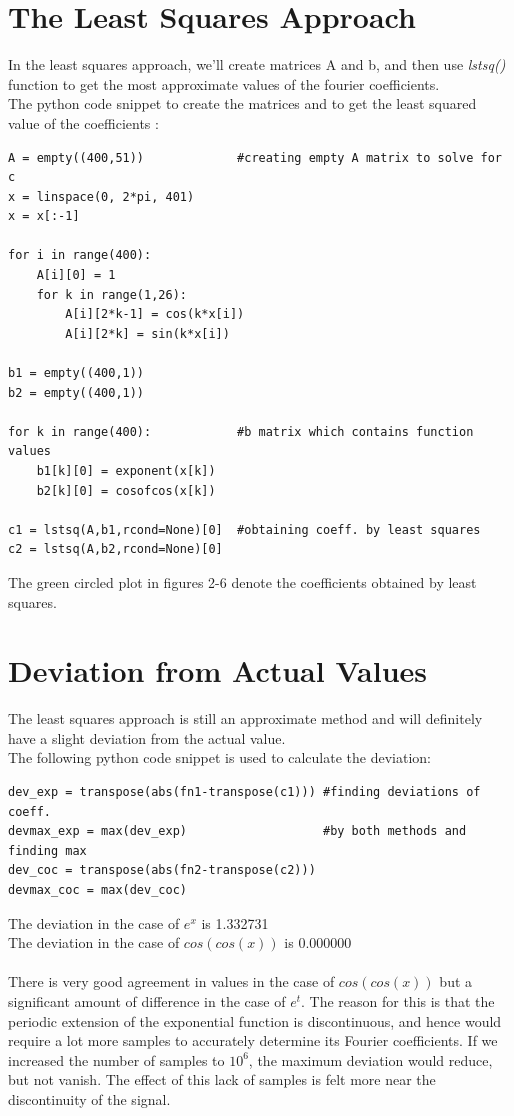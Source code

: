 \documentclass[11pt, a4paper]{article}
\begin{document}
\section{The Least Squares Approach}
In the least squares approach, we'll create matrices A and b, and then use \textit{lstsq()} function to get the most approximate values of the fourier coefficients.\\
The python code snippet to create the matrices and to get the least squared value of the coefficients :
\begin{verbatim}	
A = empty((400,51))             #creating empty A matrix to solve for c
x = linspace(0, 2*pi, 401)
x = x[:-1]

for i in range(400):
    A[i][0] = 1
    for k in range(1,26):
        A[i][2*k-1] = cos(k*x[i])
        A[i][2*k] = sin(k*x[i])

b1 = empty((400,1))
b2 = empty((400,1))

for k in range(400):            #b matrix which contains function values
    b1[k][0] = exponent(x[k])
    b2[k][0] = cosofcos(x[k])

c1 = lstsq(A,b1,rcond=None)[0]  #obtaining coeff. by least squares
c2 = lstsq(A,b2,rcond=None)[0]
\end{verbatim}
The green circled plot in figures 2-6 denote the coefficients obtained by least squares. 
     
\section{Deviation from Actual Values} 
The least squares approach is still an approximate method and will definitely have a slight deviation from the actual value.\\
The following python code snippet is used to calculate the deviation:
\begin{verbatim}	
dev_exp = transpose(abs(fn1-transpose(c1))) #finding deviations of coeff.
devmax_exp = max(dev_exp)                   #by both methods and finding max
dev_coc = transpose(abs(fn2-transpose(c2)))
devmax_coc = max(dev_coc)
\end{verbatim}
The deviation in the case of $e^{x}$ is 1.332731\\
The deviation in the case of $cos(cos(x))$ is 0.000000\\\\
There is very good agreement in values in the case of $cos(cos(x))$ but a significant amount of difference in the case of $e^{t}$. The reason for this is that the periodic extension of the exponential function is discontinuous, and hence would require a lot more samples to accurately determine its Fourier coefficients. If we increased the number of samples to $10^{6}$, the maximum deviation would reduce, but not vanish.
The effect of this lack of samples is felt more near the discontinuity of the signal.
\end{document}
